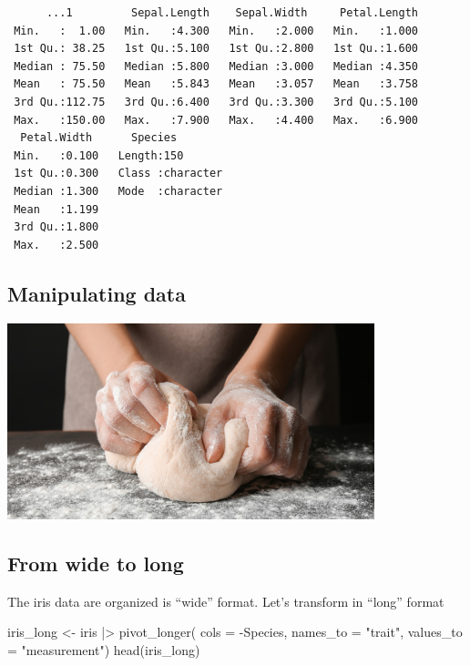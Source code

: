 \documentclass[
  letterpaper,
  DIV=11,
  numbers=noendperiod,
  oneside]{scrartcl}
\newenvironment{Shaded}{\begin{snugshade}}{\end{snugshade}}
\newcommand{\AttributeTok}[1]{\textcolor[rgb]{0.40,0.45,0.13}{#1}}
\newcommand{\FunctionTok}[1]{\textcolor[rgb]{0.28,0.35,0.67}{#1}}
\newcommand{\NormalTok}[1]{\textcolor[rgb]{0.00,0.23,0.31}{#1}}
\newcommand{\OtherTok}[1]{\textcolor[rgb]{0.00,0.23,0.31}{#1}}
\newcommand{\SpecialCharTok}[1]{\textcolor[rgb]{0.37,0.37,0.37}{#1}}
\newcommand{\StringTok}[1]{\textcolor[rgb]{0.13,0.47,0.30}{#1}}
\begin{document}
\begin{verbatim}
      ...1         Sepal.Length    Sepal.Width     Petal.Length  
 Min.   :  1.00   Min.   :4.300   Min.   :2.000   Min.   :1.000  
 1st Qu.: 38.25   1st Qu.:5.100   1st Qu.:2.800   1st Qu.:1.600  
 Median : 75.50   Median :5.800   Median :3.000   Median :4.350  
 Mean   : 75.50   Mean   :5.843   Mean   :3.057   Mean   :3.758  
 3rd Qu.:112.75   3rd Qu.:6.400   3rd Qu.:3.300   3rd Qu.:5.100  
 Max.   :150.00   Max.   :7.900   Max.   :4.400   Max.   :6.900  
  Petal.Width      Species         
 Min.   :0.100   Length:150        
 1st Qu.:0.300   Class :character  
 Median :1.300   Mode  :character  
 Mean   :1.199                     
 3rd Qu.:1.800                     
 Max.   :2.500                     
\end{verbatim}

\subsection{Manipulating data}\label{manipulating-data}

\includegraphics[width=0.8\textwidth,height=\textheight]{Intro_R_files/mediabag/person-making-fresh-.jpg}

\subsection{From wide to long}\label{from-wide-to-long}

The iris data are organized is ``wide'' format. Let's transform in
``long'' format

\begin{Shaded}
\begin{Highlighting}[]
\NormalTok{iris\_long }\OtherTok{\textless{}{-}}\NormalTok{ iris }\SpecialCharTok{|\textgreater{}} \FunctionTok{pivot\_longer}\NormalTok{( }
                    \AttributeTok{cols =} \SpecialCharTok{{-}}\NormalTok{Species,}
                    \AttributeTok{names\_to =} \StringTok{"trait"}\NormalTok{,}
                    \AttributeTok{values\_to =} \StringTok{"measurement"}\NormalTok{)}
\FunctionTok{head}\NormalTok{(iris\_long)}
\end{Highlighting}
\end{Shaded}
\end{document}
